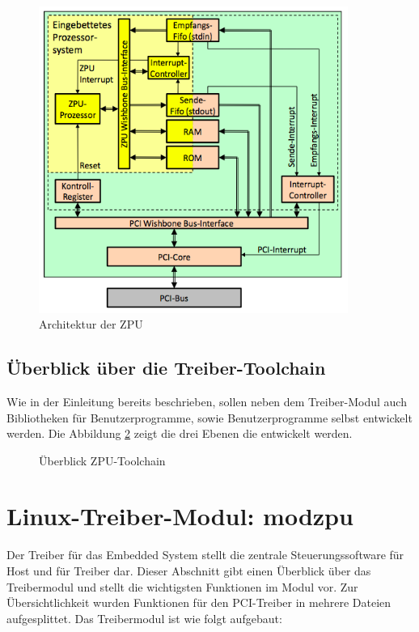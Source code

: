 \documentclass[11pt]{scrartcl}
\begin{document}
\begin{figure}[H]
	\begin{center}
		\includegraphics[width=0.9\textwidth]{images/zpu_architecture}
		\caption{Architektur der ZPU}
		\label{zpu_architecture}	
	\end{center}
\end{figure}

\subsection{Überblick über die Treiber-Toolchain}
Wie in der Einleitung bereits beschrieben, sollen neben dem Treiber-Modul auch Bibliotheken für Benutzerprogramme, sowie Benutzerprogramme selbst entwickelt werden. Die Abbildung \ref{zpu_overview} zeigt die drei Ebenen die entwickelt werden.

\begin{figure}[!htb]
	\begin{center}
		
		\caption{Überblick ZPU-Toolchain}
		\label{zpu_overview}	
	\end{center}
\end{figure}

\pagebreak
\section{Linux-Treiber-Modul: modzpu}
Der Treiber für das Embedded System stellt die zentrale Steuerungssoftware für Host und für Treiber dar. Dieser Abschnitt gibt einen Überblick über das Treibermodul und stellt die wichtigsten Funktionen im Modul vor. Zur Übersichtlichkeit wurden Funktionen für den PCI-Treiber in mehrere Dateien aufgesplittet. Das Treibermodul ist wie folgt aufgebaut:
\end{document}
